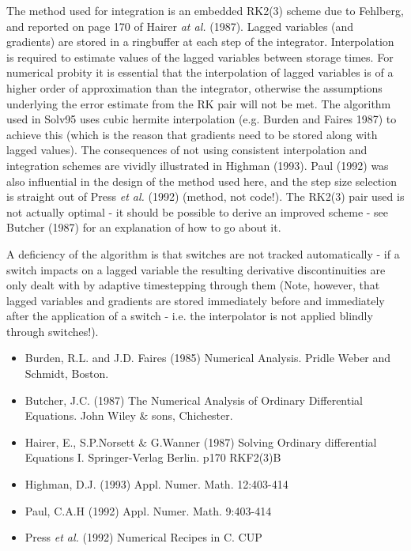 \documentclass[10pt] {article}
\begin{document}
The method used for integration is an embedded RK2(3) scheme due to Fehlberg, and reported on %
page 170 of Hairer {\it at al.} (1987). Lagged variables (and gradients) are stored in a %
ringbuffer at each step of the integrator. Interpolation is required to estimate values of the %
lagged variables between storage times.  For numerical probity it is essential that the %
interpolation of lagged variables is of a higher order of approximation than the integrator, %
otherwise the assumptions underlying the error estimate from the RK pair will not be met. The %
algorithm used in Solv95 uses cubic hermite interpolation (e.g. Burden and Faires 1987) to %
achieve this (which is the reason that gradients need to be stored along with lagged values). The %
consequences of not using consistent interpolation and integration schemes are vividly %
illustrated in Highman (1993). Paul (1992) was also influential in the design of the method used %
here, and the step size selection is straight out of Press {\it et al.} (1992) (method, not %
code!). The RK2(3) pair used is not actually optimal - it should be possible to derive an %
improved scheme - see Butcher (1987) for an explanation of how to go about it. 

A deficiency of the algorithm is that switches are not tracked automatically -  if a switch %
impacts on a lagged variable the resulting derivative discontinuities are only dealt with by %
adaptive timestepping through them (Note, however, that lagged variables and gradients are stored %
immediately before and immediately after the application of a switch - i.e. the interpolator is %
not applied blindly through switches!). 

\begin{itemize}
\item[] Burden, R.L. and J.D. Faires (1985) Numerical Analysis. Pridle Weber and Schmidt, Boston.
\item[] Butcher, J.C. (1987) The Numerical Analysis of Ordinary Differential   
 Equations. John Wiley \& sons, Chichester.     
\item[] Hairer, E., S.P.Norsett \& G.Wanner (1987) Solving Ordinary differential 
                   Equations I. Springer-Verlag Berlin. p170 RKF2(3)B
\item[] Highman, D.J. (1993) Appl. Numer. Math. 12:403-414
\item[] Paul, C.A.H (1992) Appl. Numer. Math. 9:403-414
\item[] Press {\it et al.} (1992) Numerical Recipes in C. CUP 
\end{itemize}
  
\end{document}
